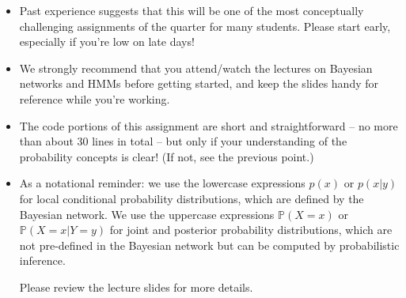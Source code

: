 \begin{itemize}
\item Past experience suggests that this will be one of the most conceptually
  challenging assignments of the quarter for many students.  Please start early,
  especially if you're low on late days!
\item We strongly recommend that you attend/watch the lectures on Bayesian
networks and HMMs before getting started, and keep the slides handy for
reference while you're working.
\item The code portions of this assignment are short and straightforward -- no
more than about 30 lines in total -- but only if your understanding of the
probability concepts is clear!  (If not, see the previous point.)
\item As a notational reminder: we use the lowercase expressions $p(x)$ or
$p(x\vert y)$ for local conditional probability distributions, which are defined by
the Bayesian network.  We use the uppercase expressions $\mathbb P(X = x)$ or
$\mathbb P(X = x \vert Y = y)$ for joint and posterior probability distributions,
which are not pre-defined in the Bayesian network but can be computed by
probabilistic inference.

Please review the lecture slides for more details.
\end{itemize}

